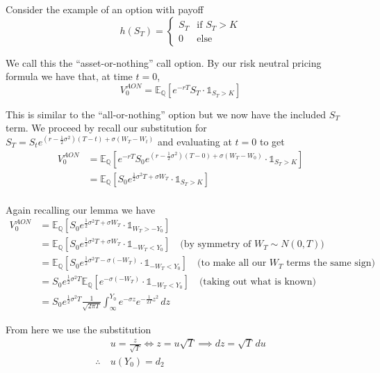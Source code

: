 \documentclass[12pt]{article}
\newlength\tindent
\renewcommand{\indent}{\hspace*{\tindent}}
\begin{document}
Consider the example of an option with payoff 
\begin{equation*}
	h(S_T) = 
	\begin{cases}
		S_T & \text{if } S_T > K \\
		0 & \text{else}
	\end{cases}
\end{equation*}

\indent We call this the ``asset-or-nothing'' call option. By our risk neutral pricing formula we have that, at time $t = 0$,
\begin{equation*}
	V^{AON}_0 = \mathbb E_{\mathbb Q}[ e^{-rT}S_T\cdot \mathds 1_{S_T > K}]
\end{equation*}

\indent This is similar to the ``all-or-nothing'' option but we now have the included $S_T$ term. We proceed by recall our substitution for $S_T = S_te^{(r - \frac{1}{2}\sigma^2)(T - t) + \sigma(W_T - W_t)}$ and evaluating at $t = 0$ to get
\begin{align*}
	V^{AON}_0 &= \mathbb E_{\mathbb Q}[e^{-rT}S_0e^{(r - \frac{1}{2}\sigma^2)(T - 0) + \sigma(W_T - W_0)}\cdot \mathds 1_{S_T > K}] \\
	&= \mathbb E_{\mathbb Q}[S_0e^{\frac{1}{2}\sigma^2T + \sigma W_T} \cdot \mathds 1_{S_T > K}] \\
\end{align*}

Again recalling our lemma we have
\begin{align*}
	V^{AON}_0 &= \mathbb E_{\mathbb Q}[S_0e^{\frac{1}{2}\sigma^2T + \sigma W_T} \cdot \mathds 1_{W_T > -Y_0}] \\
		&= \mathbb E_{\mathbb Q}[S_0e^{\frac{1}{2}\sigma^2T + \sigma W_T} \cdot \mathds 1_{-W_T < Y_0}] \quad \text{(by symmetry of $W_T\sim N(0, T)$)} \\
		&= \mathbb E_{\mathbb Q}[S_0e^{\frac{1}{2}\sigma^2T - \sigma(-W_T)} \cdot \mathds 1_{-W_T < Y_0}] \quad \text{(to make all our $W_T$ terms the same sign)} \\
		&= S_0e^{\frac{1}{2}\sigma^2T}\mathbb E_{\mathbb Q}[e^{-\sigma(-W_T)} \cdot \mathds 1_{-W_T < Y_0}] \quad \text{(taking out what is known)} \\
		&= S_0e^{\frac{1}{2}\sigma^2T}\frac{1}{\sqrt{2\pi T}} \int^{Y_0}_{\infty} e^{-\sigma z} e^{-\frac{1}{2T}z^2}\,dz
\end{align*}

From here we use the substitution
\begin{align*}
	&u = \frac{z}{\sqrt{T}} \iff z = u\sqrt{T} \implies dz = \sqrt{T}\,du \\
	\therefore~&u(Y_0) = d_2
\end{align*}
\end{document}
